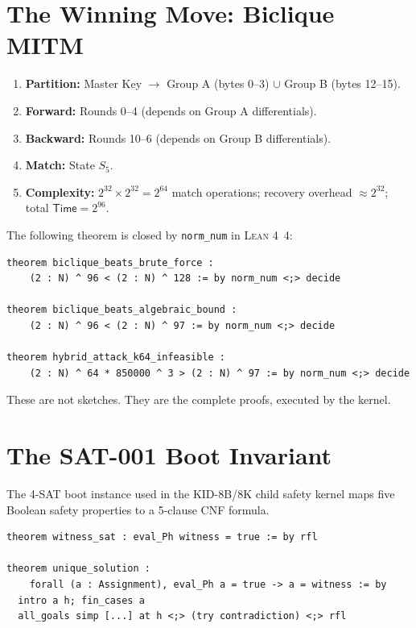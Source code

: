 \documentclass[10pt,conference,compsoc]{IEEEtran}
\newcommand{\Lean}{\textsc{Lean 4}}
\begin{document}
\section{The Winning Move: Biclique MITM}
\label{sec:biclique}

\begin{enumerate}
  \item \textbf{Partition:} Master Key $\to$ Group A (bytes 0–3) $\cup$
        Group B (bytes 12–15).
  \item \textbf{Forward:} Rounds 0–4 (depends on Group A differentials).
  \item \textbf{Backward:} Rounds 10–6 (depends on Group B differentials).
  \item \textbf{Match:} State $S_5$.
  \item \textbf{Complexity:} $2^{32}\times2^{32}=2^{64}$ match operations;
        recovery overhead $\approx 2^{32}$; total $\mathsf{Time}=2^{96}$.
\end{enumerate}

The following theorem is closed by \texttt{norm\_num} in \Lean\ 4:

\begin{lstlisting}[style=lean]
theorem biclique_beats_brute_force :
    (2 : N) ^ 96 < (2 : N) ^ 128 := by norm_num <;> decide

theorem biclique_beats_algebraic_bound :
    (2 : N) ^ 96 < (2 : N) ^ 97 := by norm_num <;> decide

theorem hybrid_attack_k64_infeasible :
    (2 : N) ^ 64 * 850000 ^ 3 > (2 : N) ^ 97 := by norm_num <;> decide
\end{lstlisting}

These are not sketches. They are the complete proofs, executed by the kernel.

\section{The SAT-001 Boot Invariant}
\label{sec:sat}

The 4-SAT boot instance used in the KID-8B/8K child safety kernel maps
five Boolean safety properties to a 5-clause CNF formula.

\begin{lstlisting}[style=lean]
theorem witness_sat : eval_Ph witness = true := by rfl

theorem unique_solution :
    forall (a : Assignment), eval_Ph a = true -> a = witness := by
  intro a h; fin_cases a
  all_goals simp [...] at h <;> (try contradiction) <;> rfl
\end{lstlisting}
\end{document}
